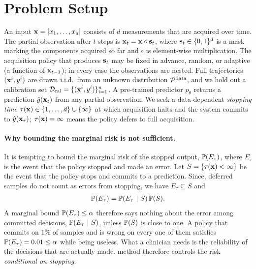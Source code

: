 \section{Problem Setup}
\label{sec:setup}
An input $\mathbf{x} = [x_1, \dots, x_d]$ consists of $d$ measurements that are acquired over time. The partial observation after $t$ steps is $\mathbf{x}_t = \mathbf{x} \circ \mathbf{s}_t$, where $\mathbf{s}_t \in \{0,1\}^d$ is a mask marking the components acquired so far and $\circ$ is element-wise multiplication. The acquisition policy that produces $\mathbf{s}_t$ may be fixed in advance, random, or adaptive (a function of $\mathbf{x}_{t-1}$); in every case the observations are nested. 
Full trajectories $(\mathbf{x}^i, y^i)$ are drawn i.i.d.\ from an unknown distribution $\mathcal{P}^{\text{data}}$, and we hold out a calibration set $\mathcal{D}_{\text{cal}} = \{(\mathbf{x}^i, y^i)\}_{i=1}^{n}$. 
A pre-trained predictor $p_\theta$ returns a prediction $\hat{y}(\mathbf{x}_t)$ from any partial observation. We seek a data-dependent \emph{stopping time} $\tau(\mathbf{x}) \in \{1, \dots, d\} \cup \{\infty\}$ at which acquisition halts and the system commits to $\hat{y}(\mathbf{x}_\tau)$; $\tau(\mathbf{x}) = \infty$ means the policy defers to full acquisition.

\paragraph{Why bounding the marginal risk is not sufficient. }
It is tempting to bound the marginal risk of the stopped output, $\mathbb{P}(E_\tau)$, where $E_\tau$ is the event that the policy stopped and made an error.
Let $S = \{\tau(\mathbf{x}) < \infty\}$ be the event that the policy stops and commits to a prediction. 
Since, deferred samples do not count as errors from stopping, we have $E_\tau \subseteq S$ and
\begin{align}
\label{eq:marg_decomp}
    \mathbb{P}(E_\tau) = \mathbb{P}(E_\tau ~\vert~ S)\,\mathbb{P}(S).
\end{align}
A marginal bound $\mathbb{P}(E_\tau) \le \alpha$ therefore says nothing about the error among committed decisions, $\mathbb{P}(E_\tau ~\vert~ S)$, unless $\mathbb{P}(S)$ is close to one. 
A policy that commits on $1\%$ of samples and is wrong on every one of them satisfies $\mathbb{P}(E_\tau) = 0.01 \le \alpha$ while being useless. 
What a clinician needs is the reliability of the decisions that are actually made. \gls{method} therefore controls the risk \emph{conditional on stopping}.
